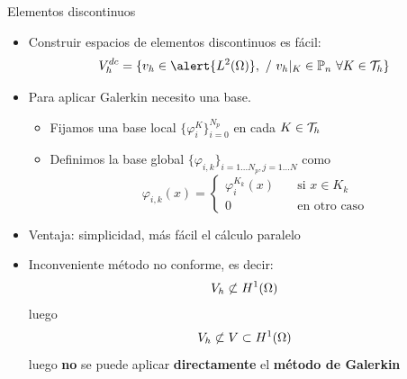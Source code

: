 \documentclass[10pt,leqno]{beamer}
\newcommand{\Nt}{N}
\newcommand{\Np}{{N_p}}
\begin{document}
\begin{frame}{Elementos discontinuos}
  \begin{itemize}
  \item Construir espacios de elementos discontinuos es fácil:
  $$
  V_h^{dc} = \{ \vh\in \alert{L^2(\Omega)},\ /\ \vh|_K \in
  \mathbb{P}_n\ \forall K\in\Th\}
  $$
\item
  Para aplicar Galerkin necesito una base.
  \begin{itemize}
  \item Fijamos una base local $\{\varphi_i^K\}_{i=0}^{\Np}$ en cada
    $K\in {\cal T}_h$
  \item Definimos la base global
    $\{\varphi_{i,k}\}_{i=1...\Np, j=1...\Nt}$ como
    \begin{equation*}
      \varphi_{i,k}(x) = \left\{
        \begin{aligned}
          \varphi_i^{K_k} (x) &\quad \text{si } x\in K_k \\
          0 &\quad \text{en otro caso}
        \end{aligned}
      \right.
    \end{equation*}
  \end{itemize}
\item Ventaja: simplicidad, más fácil el cálculo paralelo
\item Inconveniente método no conforme, es decir:
  $$V_h\not\subset H^1(\Omega)$$
  luego
  $$
  V_h \not\subset V\subset H^1(\Omega)
  $$
 luego \textbf{no} se puede aplicar \textbf{directamente} el \textbf{método de Galerkin}
\end{itemize}
\end{frame}
\end{document}

